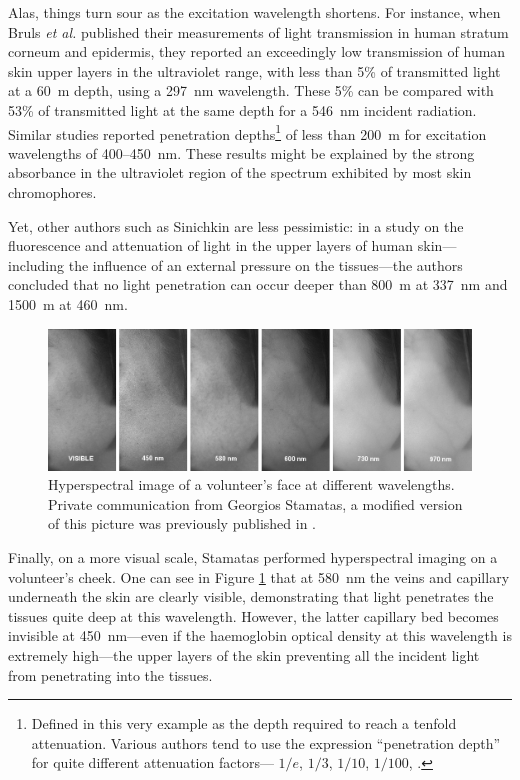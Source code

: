 Alas, things turn sour as the excitation wavelength shortens. For instance, when Bruls \textit{et al.}\cite{bruls1984} published their measurements of light transmission in human stratum corneum and epidermis, they reported an exceedingly low transmission of human skin upper layers in the ultraviolet range, with less than 5\% of transmitted light at a 60~\textmu{}m depth, using a 297~nm wavelength. These 5\% can be compared with 53\% of transmitted light at the same depth for a 546~nm incident radiation. Similar studies reported penetration depths\footnote{Defined in this very example as the depth required to reach a tenfold attenuation. Various authors tend to use the expression \enquote{penetration depth} for quite different attenuation factors---\eg{} $1/e$, $1/3$, $1/10$, $1/100$, \etc{}.} of less than 200~\textmu{}m for excitation wavelengths of 400--450~nm\cite{gmitro1988, koenig1998, barun2007}. These results might be explained by the strong absorbance in the ultraviolet region of the spectrum exhibited by most skin chromophores\cite{young1997}.

Yet, other authors such as Sinichkin \etal{} are less pessimistic: in a study on the fluorescence and attenuation of light in the upper layers of human skin---including the influence of an external pressure on the tissues---the authors concluded that no light penetration can occur deeper than 800~\textmu{}m at 337~nm and 1500~\textmu{}m at 460~nm\cite{sinichkin1998}.

\begin{figure}
	\centering
	\includegraphics[width=\linewidth]{1_main_matter/co2hb_figures/stamatas_hs.png}
	\caption[Hyperspectral image of a volunteer's face at different wavelengths.]{Hyperspectral image of a volunteer's face at different wavelengths. Private communication from Georgios Stamatas, a modified version of this picture was previously published in \cite{stamatas2003}.}
	\label{fig:co2hb:stamatas_fig}
\end{figure}

Finally, on a more visual scale, Stamatas \etal{}\cite{stamatas2003} performed hyperspectral imaging on a volunteer's cheek. One can see in Figure \ref{fig:co2hb:stamatas_fig} that at 580~nm the veins and capillary underneath the skin are clearly visible, demonstrating that light penetrates the tissues quite deep at this wavelength. However, the latter capillary bed becomes invisible at 450~nm---even if the haemoglobin optical density at this wavelength is extremely high---the upper layers of the skin preventing all the incident light from penetrating into the tissues.

